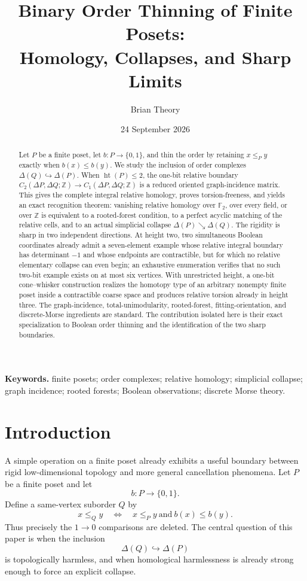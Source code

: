 \documentclass[11pt]{article}
\title{\textbf{Binary Order Thinning of Finite Posets:\\Homology, Collapses, and Sharp Limits}}
\author{Brian Theory}
\date{24 September 2026}
\theoremstyle{definition}
\theoremstyle{remark}
\DeclareMathOperator{\posht}{ht}
\newcommand{\Z}{\mathbb Z}
\newcommand{\Ftwo}{\mathbb F_2}
\newcommand{\D}{\Delta}
\newcommand{\searrowrel}{\mathrel{\searrow}}
\begin{document}
\maketitle

\begin{abstract}
Let $P$ be a finite poset, let $b:P\to\{0,1\}$, and thin the order by retaining
$x\le_Py$ exactly when $b(x)\le b(y)$.  We study the inclusion of order complexes
$\D(Q)\hookrightarrow\D(P)$.  When $\posht(P)\le2$, the one-bit relative boundary
$C_2(\D P,\D Q;\Z)\to C_1(\D P,\D Q;\Z)$ is a reduced oriented graph-incidence
matrix.  This gives the complete integral relative homology, proves torsion-freeness,
and yields an exact recognition theorem: vanishing relative homology over $\Ftwo$,
over every field, or over $\Z$ is equivalent to a rooted-forest condition, to a
perfect acyclic matching of the relative cells, and to an actual simplicial collapse
$\D(P)\searrowrel\D(Q)$.  The rigidity is sharp in two independent directions.
At height two, two simultaneous Boolean coordinates already admit a seven-element
example whose relative integral boundary has determinant $-1$ and whose endpoints
are contractible, but for which no relative elementary collapse can even begin;
an exhaustive enumeration verifies that no such two-bit example exists on at most
six vertices.  With unrestricted height, a one-bit cone--whisker construction
realizes the homotopy type of an arbitrary nonempty finite poset inside a contractible
coarse space and produces relative torsion already in height three.  The graph-incidence,
total-unimodularity, rooted-forest, fitting-orientation, and discrete-Morse ingredients
are standard.  The contribution isolated here is their exact specialization to
Boolean order thinning and the identification of the two sharp boundaries.
\end{abstract}

\noindent\textbf{Keywords.} finite posets; order complexes; relative homology; simplicial collapse;
graph incidence; rooted forests; Boolean observations; discrete Morse theory.

\section{Introduction}\label{sec:intro}

A simple operation on a finite poset already exhibits a useful boundary between rigid
low-dimensional topology and more general cancellation phenomena.  Let $P$ be a finite
poset and let
\[
  b:P\longrightarrow\{0,1\}.
\]
Define a same-vertex suborder $Q$ by
\begin{equation}\label{eq:binary-thinning}
  x\le_Q y\quad\Longleftrightarrow\quad x\le_P y\ \text{and}\ b(x)\le b(y).
\end{equation}
Thus precisely the $1\to0$ comparisons are deleted.  The central question of this
paper is when the inclusion
\[
  \D(Q)\hookrightarrow\D(P)
\]
is topologically harmless, and when homological harmlessness is already strong enough
to force an explicit collapse.
\end{document}
